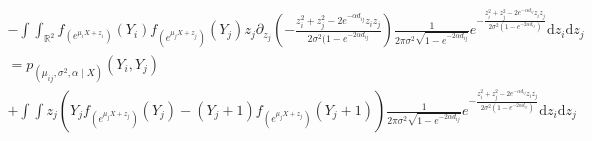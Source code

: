 \documentclass[11pt, a4paper]{article}
\begin{document}
 \begin{align*}
 - \int \int_{\mathbb{R}^2} f_{(e^{\mu_i X + z_i})}(Y_i) f_{(e^{\mu_j X + z_j})}(Y_j) z_j \partial_{z_j} (- \frac{z_i^2+z_j^2-2 e^{- \alpha d_{ij}} z_i z_j}{2 \sigma^2 (1- e^{-2 \alpha d_{ij}}}) \frac{1}{2 \pi \sigma^2 \sqrt{1-e^{-2 \alpha d_{ij}}}} e^{- \frac{z_i^2+z_j^2-2 e^{- \alpha d_{ij}} z_i z_j}{2 \sigma^2 (1- e^{-2 \alpha d_{ij}})}} \mathrm{d}z_i \mathrm{d} z_j\\
 = p_{(\mu_{ij},\sigma^2,\alpha \mid X)}(Y_i,Y_j) \\
  +  \int \int z_j(Y_j f_{(e^{\mu_j X + z_j})}(Y_j) - (Y_j+1) f_{(e^{\mu_j X + z_j})}(Y_j+1)) \frac{1}{2 \pi \sigma^2 \sqrt{1-e^{-2 \alpha d_{ij}}}} e^{- \frac{z_i^2+z_j^2-2 e^{- \alpha d_{ij}} z_i z_j}{2 \sigma^2 (1- e^{-2 \alpha d_{ij}})}} \mathrm{d}z_i \mathrm{d} z_j
 \end{align*}


\end{document}
